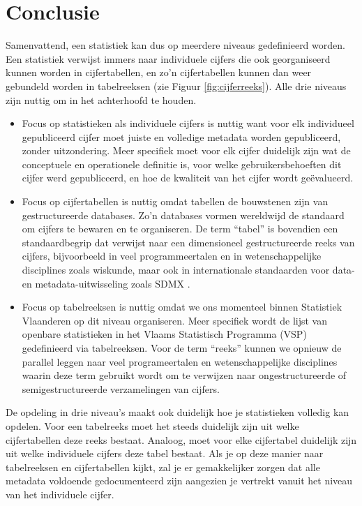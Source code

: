 \documentclass[\mainfiledir/00_handleiding_statistiekproductie.tex]{subfiles}
\begin{document}
	
	
	
	
	
	
	
	
	
	

	

	
\section{Conclusie}

Samenvattend, een statistiek kan dus op meerdere niveaus gedefinieerd worden. Een statistiek verwijst immers naar individuele cijfers die ook georganiseerd kunnen worden in cijfertabellen, en zo’n cijfertabellen kunnen dan weer gebundeld worden in tabelreeksen (zie Figuur \ref{fig:cijferreeks}). Alle drie niveaus zijn nuttig om in het achterhoofd te houden. 
\begin{itemize}
\item Focus op statistieken als individuele cijfers is nuttig want voor elk individueel gepubliceerd cijfer moet juiste en volledige metadata worden gepubliceerd, zonder uitzondering. Meer specifiek moet voor elk cijfer duidelijk zijn wat de conceptuele en operationele definitie is, voor welke gebruikersbehoeften dit cijfer werd gepubliceerd, en hoe de kwaliteit van het cijfer wordt geëvalueerd. 
\item Focus op cijfertabellen is nuttig omdat tabellen de bouwstenen zijn van gestructureerde databases. Zo'n databases vormen wereldwijd de standaard om cijfers te bewaren en te organiseren. De term ``tabel'' is bovendien een standaardbegrip dat verwijst naar een dimensioneel gestructureerde reeks van cijfers, bijvoorbeeld in veel programmeertalen en in wetenschappelijke disciplines zoals wiskunde, maar ook in internationale standaarden voor data- en metadata-uitwisseling zoals SDMX \parencite{Eurostat2023SDMX}.  
\item Focus op tabelreeksen is nuttig omdat we ons momenteel binnen Statistiek Vlaanderen op dit niveau organiseren. Meer specifiek wordt de lijst van openbare statistieken in het Vlaams Statistisch Programma (VSP) gedefinieerd via tabelreeksen. Voor de term ``reeks'' kunnen we opnieuw de parallel leggen naar veel programeertalen en wetenschappelijke disciplines waarin deze term gebruikt wordt om te verwijzen naar ongestructureerde of semigestructureerde verzamelingen van cijfers. 
\end{itemize}
De opdeling in drie niveau's maakt ook duidelijk hoe je statistieken volledig kan opdelen. Voor een tabelreeks moet het steeds duidelijk zijn uit welke cijfertabellen deze reeks bestaat. Analoog, moet voor elke cijfertabel duidelijk zijn uit welke individuele cijfers deze tabel bestaat. Als je op deze manier naar tabelreeksen en cijfertabellen kijkt, zal je er gemakkelijker zorgen dat alle metadata voldoende gedocumenteerd zijn aangezien je vertrekt vanuit het niveau van het individuele cijfer. 
\end{document}
